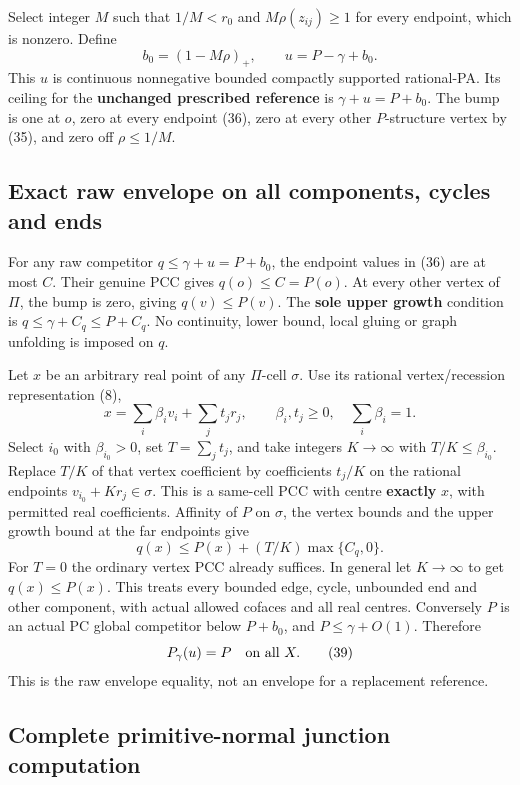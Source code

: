 \documentclass[
  11pt,
]{article}
\begin{document}
Select integer \(M\) such that \(1/M<r_0\) and \(M\rho(z_{ij})\geq1\)
for every endpoint, which is nonzero. Define \[
              b_0=(1-M\rho)_+,\qquad
              u=P-\gamma+b_0.                               \tag{37}
\] This \(u\) is continuous nonnegative bounded compactly supported
rational-PA. Its ceiling for the \textbf{unchanged prescribed reference}
is \(\gamma+u=P+b_0\). The bump is one at \(o\), zero at every endpoint
(36), zero at every other \(P\)-structure vertex by (35), and zero off
\(\rho\leq1/M\).

\subsection{Exact raw envelope on all components, cycles and
ends}\label{exact-raw-envelope-on-all-components-cycles-and-ends}

For any raw competitor \(q\leq\gamma+u=P+b_0\), the endpoint values in
(36) are at most \(C\). Their genuine PCC gives \(q(o)\leq C=P(o)\). At
every other vertex of \(\Pi\), the bump is zero, giving
\(q(v)\leq P(v)\). The \textbf{sole upper growth} condition is
\(q\leq\gamma+C_q\leq P+C_q\). No continuity, lower bound, local gluing
or graph unfolding is imposed on \(q\).

Let \(x\) be an arbitrary real point of any \(\Pi\)-cell \(\sigma\). Use
its rational vertex/recession representation (8), \[
 x=\sum_i\beta_iv_i+\sum_jt_jr_j,\qquad
 \beta_i,t_j\geq0,\quad\sum_i\beta_i=1.
\] Select \(i_0\) with \(\beta_{i_0}>0\), set \(T=\sum_jt_j\), and take
integers \(K\to\infty\) with \(T/K\leq\beta_{i_0}\). Replace \(T/K\) of
that vertex coefficient by coefficients \(t_j/K\) on the rational
endpoints \(v_{i_0}+Kr_j\in\sigma\). This is a same-cell PCC with centre
\textbf{exactly} \(x\), with permitted real coefficients. Affinity of
\(P\) on \(\sigma\), the vertex bounds and the upper growth bound at the
far endpoints give \[
             q(x)\leq P(x)+(T/K)\max\{C_q,0\}.               \tag{38}
\] For \(T=0\) the ordinary vertex PCC already suffices. In general let
\(K\to\infty\) to get \(q(x)\leq P(x)\). This treats every bounded edge,
cycle, unbounded end and other component, with actual allowed cofaces
and all real centres. Conversely \(P\) is an actual PC global competitor
below \(P+b_0\), and \(P\leq\gamma+O(1)\). Therefore \[
                             P_\gamma(u)=P\quad\hbox{on all }X.       \tag{39}
\] This is the raw envelope equality, not an envelope for a replacement
reference.

\subsection{Complete primitive-normal junction
computation}\label{complete-primitive-normal-junction-computation}
\end{document}
